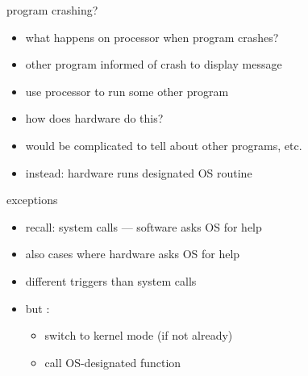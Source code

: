\usetikzlibrary{shapes.geometric}

\begin{frame}{program crashing?}
\begin{itemize}
\item what happens on processor when program crashes?
\vspace{.5cm}
\item other program informed of crash to display message
\item use processor to run some other program
\vspace{.5cm}
\item<2-> how does hardware do this?
\item<2-> would be complicated to tell about other programs, etc.
\item<2-> instead: hardware runs designated OS routine
\end{itemize}
\end{frame}

\begin{frame}{exceptions}
\begin{itemize}
\item recall: system calls --- software asks OS for help
\vspace{.5cm}
\item also cases where hardware asks OS for help
\item different triggers than system calls
\item but :
    \begin{itemize}
    \item switch to kernel mode (if not already)
    \item call OS-designated function
    \end{itemize}
\end{itemize}
\end{frame}

